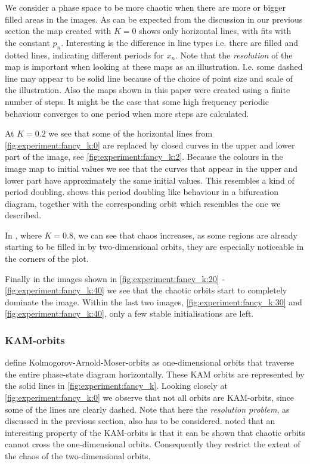 We consider a phase space to be more chaotic when there are more or bigger filled areas in the images. As can be expected from the discussion in our previous section the map created with $K = 0$ shows only horizontal lines, with fits with the constant $p_n$. Interesting is the difference in line types i.e. there are filled and dotted lines, indicating different periods for $x_n$. Note that the \textit{resolution} of the map is important when looking at these maps as an illustration. I.e. some dashed line may appear to be solid line because of the choice of point size and scale of the illustration. Also the maps shown in this paper were created using a finite number of steps. It might be the case that some high frequency periodic behaviour converges to one period when more steps are calculated.

At $K = 0.2$ we see that some of the horizontal lines from \cref{fig:experiment:fancy_k:0} are replaced by closed curves in the upper and lower part of the image, see \cref{fig:experiment:fancy_k:2}. Because the colours in the image map to initial values we see that the curves that appear in the upper and lower part have approximately the same initial values. This resembles a kind of period doubling.  shows this period doubling like behaviour in a bifurcation diagram, together with the corresponding orbit which resembles the one we described.

In , where $K = 0.8$, we can see that chaos increases, as some regions are already starting to be filled in by two-dimensional orbits, they are especially noticeable in the corners of the plot.

 Finally in the images shown in \cref{fig:experiment:fancy_k:20} - \ref{fig:experiment:fancy_k:40} we see that the chaotic orbits start to completely dominate the image. Within the last two images, \cref{fig:experiment:fancy_k:30} and \ref{fig:experiment:fancy_k:40}, only a few stable initialisations are left. 

\subsubsection{KAM-orbits}
\label{ss:b:kam}
\citeauthor{kenzel1997physics} define Kolmogorov-Arnold-Moser-orbits as one-dimensional orbits that traverse the entire phase-state diagram horizontally. These KAM orbits are represented by the solid lines in  \cref{fig:experiment:fancy_k}. Looking closely at \cref{fig:experiment:fancy_k:0} we observe that not all orbits are KAM-orbits, since some of the lines are clearly dashed. Note that here the \textit{resolution problem}, as discussed in the previous section, also has to be considered. \citeauthor{kenzel1997physics} noted that an interesting property of the KAM-orbits is that it can be shown that chaotic orbits cannot cross the one-dimensional orbits. Consequently they restrict the extent of the chaos of the two-dimensional orbits.\\

